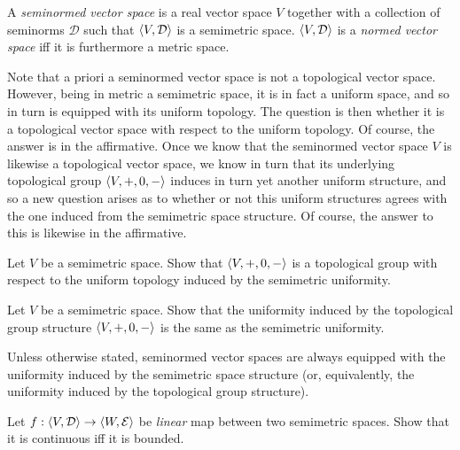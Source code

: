 \begin{dfn}\label{SeminormedVectorSpace}
A \emph{seminormed vector space} is a real vector space $V$ together with a collection of seminorms $\mathcal{D}$ such that $\langle V,\mathcal{D}\rangle$ is a semimetric space.  $\langle V,\mathcal{D}\rangle$ is a \emph{normed vector space} iff it is furthermore a metric space.
\end{dfn}
Note that a priori a seminormed vector space is not a topological vector space.  However, being in metric a semimetric space, it is in fact a uniform space, and so in turn is equipped with its uniform topology.  The question is then whether it is a topological vector space with respect to the uniform topology.  Of course, the answer is in the affirmative.  Once we know that the seminormed vector space $V$ is likewise a topological vector space, we know in turn that its underlying topological group $\langle V,+,0,-\rangle$ induces in turn yet another uniform structure, and so a new question arises as to whether or not this uniform structures agrees with the one induced from the semimetric space structure.  Of course, the answer to this is likewise in the affirmative.
\begin{exr}
Let $V$ be a semimetric space.  Show that $\langle V,+,0,-\rangle$ is a topological group with respect to the uniform topology induced by the semimetric uniformity.
\end{exr}
\begin{exr}
Let $V$ be a semimetric space.  Show that the uniformity induced by the topological group structure $\langle V,+,0,-\rangle$ is the same as the semimetric uniformity.
\end{exr}
\begin{textequation}
Unless otherwise stated, seminormed vector spaces are always equipped with the uniformity induced by the semimetric space structure (or, equivalently, the uniformity induced by the topological group structure).
\end{textequation}
\begin{exr}\label{exr4.3.57}
Let $f:\langle V,\mathcal{D}\rangle\rightarrow \langle W,\mathcal{E}\rangle$ be \emph{linear} map between two semimetric spaces.  Show that it is continuous iff it is bounded.
\end{exr}

